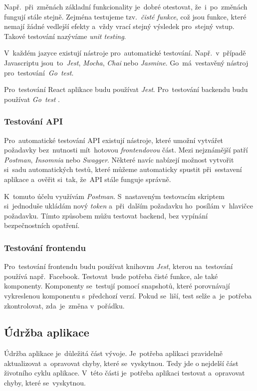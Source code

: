 \documentclass[10pt,a4paper]{article}
\begin{document}
        Např.~při~změnách základní funkcionality je~dobré otestovat, že~i~po~změnách fungují stále stejně. Zejména testujeme tzv.~\emph{čisté funkce}, což jsou funkce, které nemají žádné vedlejší efekty a~vždy vrací stejný výsledek pro~stejný vstup. Takové testování nazýváme \emph{unit testing}.
        
        V~každém jazyce existují nástroje pro~automatické testování. Např.~v~případě Javascriptu jsou~to~\emph{Jest}, \emph{Mocha}, \emph{Chai} nebo \emph{Jasmine}. Go~má~vestavěný nástroj pro~testování~\emph{Go~test}.
        
        Pro~testování React aplikace budu používat \emph{Jest}. Pro~testování backendu budu používat \emph{Go~test} \cite{jestjsTestingReact}.
        
        \subsubsection{Testování API}
        Pro~automatické testování API existují nástroje, které umožní vytvářet požadavky bez~nutnosti mít~hotovou \emph{frontendovou} část. Mezi nejznámější patří \emph{Postman}, \emph{Insomnia} nebo \emph{Swagger}. Některé navíc nabízejí možnost vytvořit si~sadu automatických testů, které můžeme automaticky spustit při~sestavení aplikace a~ověřit si~tak, že~API stále funguje správně.

        K~tomuto účelu využívám \emph{Postman}. S~nastaveným testovacím skriptem si~jednoduše ukládám nový \emph{token} a~při~dalším požadavku ho~posílám v~hlavičce požadavku. Tímto způsobem můžu testovat backend, bez vypínání bezpečnostních opatření.

        \subsubsection{Testování frontendu}
        Pro~testování frontendu budu používat knihovnu \emph{Jest}, kterou na~testování používá např.~Facebook. Testovat~bude potřeba čisté funkce, ale také komponenty. Komponenty se~testují pomocí snapshotů, které porovnávají vykreslenou komponentu s~předchozí verzí. Pokud se~liší, test selže a~je~potřeba zkontrolovat, zda~je~změna v~pořádku. \cite{jestjsTestingReact}

        \subsection{Údržba aplikace}
        Údržba aplikace je~důležitá část vývoje. Je~potřeba aplikaci pravidelně aktualizovat a~opravovat chyby, které se~vyskytnou.
        Tedy jde o nejdelší část životního cyklu aplikace. V~této části je~potřeba aplikaci testovat a~opravovat chyby, které se~vyskytnou.
            
\end{document}
